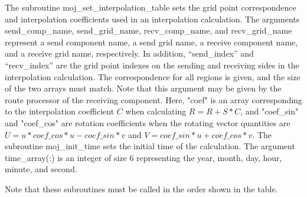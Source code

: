 \documentclass[11pt,a4paper]{report}
\begin{document}
The subroutine moj\_set\_interpolation\_table sets the grid point correspondence and interpolation coefficients used in an interpolation calculation. 
The arguments send\_comp\_name, send\_grid\_name, recv\_comp\_name, and recv\_grid\_name represent a send component name, a send grid name, a receive component name, and a receive grid name, respectively. 
In addition, “send\_index” and “recv\_index” are the grid point indexes on the sending and receiving sides in the interpolation calculation. 
The correspondence for all regions is given, and the size of the two arrays must match. 
Note that this argument may be given by the route processor of the receiving component. 
Here, "coef" is an array corresponding to the interpolation coefficient $C$ when calculating $R = R + S * C$, and
"coef\_sin" and "coef\_cos" are rotation coefficients when the rotating vector quantities are $U = u*coef\_cos*u-coef\_sin*v$ and $V = coef\_sin*u + coef\_cos*v$.
The subroutine moj\_init\_time sets the initial time of the calculation. 
The argument time\_array(:) is an integer of size 6 representing the year, month, day, hour, minute, and second.

Note that these subroutines must be called in the order shown in the table.
\end{document}
